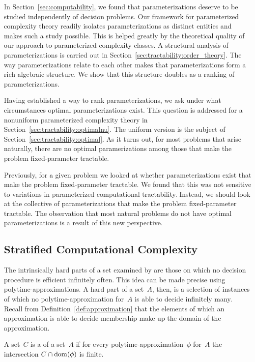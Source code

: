 In Section~\ref{sec:computability}, we found that parameterizations deserve to be studied independently of decision problems.
Our framework for parameterized complexity theory readily isolates parameterizations as distinct entities and makes such a study possible.
This is helped greatly by the theoretical quality of our approach to parameterized complexity classes.
A structural analysis of parameterizations is carried out in Section~\ref{sec:tractability:order_theory}.
The way parameterizations relate to each other makes that parameterizations form a rich algebraic structure.
We show that this structure doubles as a ranking of parameterizations.

Having established a way to rank parameterizations, we ask under what circumstances optimal parameterizations exist.
This question is addressed for a nonuniform parameterized complexity theory in Section~\ref{sec:tractability:optimalnu}.
The uniform version is the subject of Section~\ref{sec:tractability:optimal}.
As it turns out, for most problems that arise naturally, there are no optimal paramerizations among those that make the problem fixed-parameter tractable.

Previously, for a given problem we looked at whether parameterizations exist that make the problem fixed-parameter tractable.
We found that this was not sensitive to variations in parameterized computational tractability.
Instead, we should look at the collective of parameterizations that make the problem fixed-parameter tractable.
The observation that most natural problems do not have optimal parameterizations is a result of this new perspective.

\subsection{Stratified Computational Complexity}
\label{sec:tractability:stratified}%
The intrinsically hard parts of a set examined by \citeauthor{lynch1975reducibility} are those on which no decision procedure is efficient infinitely often.
This idea can be made precise using polytime-approximations.
A hard part of a set~$A$, then, is a selection of instances of which no polytime-approximation for~$A$ is able to decide infinitely many.
Recall from Definition~\ref{def:approximation} that the elements of which an approximation is able to decide membership make up the domain of the approximation.
\begin{definition}
  A set~$C$ is a  of a set~$A$ if for every polytime-approximation~$\phi$ for~$A$ the intersection $C \cap \operatorname{dom}(\phi)$ is finite.
\end{definition}

